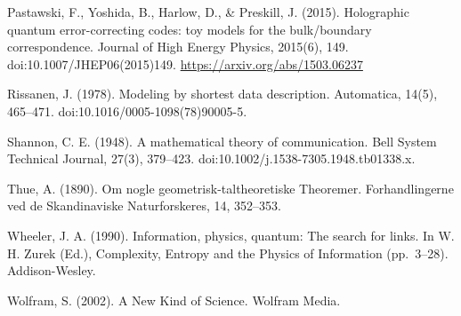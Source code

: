 \documentclass[11pt,oneside]{report}
\theoremstyle{definition}
\theoremstyle{remark}
\newenvironment{reflist}
  {\par\small\setlength{\parindent}{0pt}%
   \setlength{\leftskip}{1.6em}\setlength{\parindent}{-1.6em}%
   \setlength{\parskip}{0.4em}%
   \raggedright\hyphenpenalty=50\exhyphenpenalty=50\relax
   \sloppy}
  {\par}
\begin{document}
\begin{reflist}
Pastawski, F., Yoshida, B., Harlow, D., \& Preskill, J. (2015).
Holographic quantum error-correcting codes: toy models for the
bulk/boundary correspondence. Journal of High Energy Physics, 2015(6),
149. doi:10.1007/JHEP06(2015)149. \url{https://arxiv.org/abs/1503.06237}

Rissanen, J. (1978). Modeling by shortest data description. Automatica,
14(5), 465--471. doi:10.1016/0005-1098(78)90005-5.

Shannon, C. E. (1948). A mathematical theory of communication. Bell
System Technical Journal, 27(3), 379--423.
doi:10.1002/j.1538-7305.1948.tb01338.x.

Thue, A. (1890). Om nogle geometrisk-taltheoretiske Theoremer.
Forhandlingerne ved de Skandinaviske Naturforskeres, 14, 352--353.

Wheeler, J. A. (1990). Information, physics, quantum: The search for
links. In W. H. Zurek (Ed.), Complexity, Entropy and the Physics of
Information (pp.~3--28). Addison-Wesley.

Wolfram, S. (2002). A New Kind of Science. Wolfram Media.
\end{reflist}

\clearpage
\end{document}
